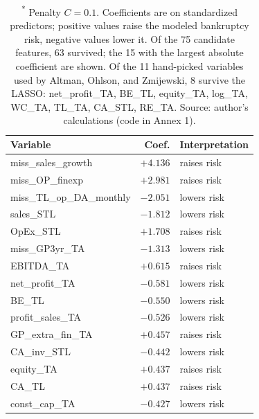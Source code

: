\documentclass[12pt,a4paper]{article}
\begin{document}
\begin{table}[ht]
\centering
\caption{Top variables selected by the LASSO logit, H1.\textsuperscript{*}}
\label{tab:lasso-survivors}
\small
\begin{tabular}{lrl}
\toprule
Variable & Coef. & Interpretation \\
\midrule
miss\_sales\_growth        & $+4.136$ & raises risk \\
miss\_OP\_finexp           & $+2.981$ & raises risk \\
miss\_TL\_op\_DA\_monthly  & $-2.051$ & lowers risk \\
sales\_STL                 & $-1.812$ & lowers risk \\
OpEx\_STL                  & $+1.708$ & raises risk \\
miss\_GP3yr\_TA            & $-1.313$ & lowers risk \\
EBITDA\_TA                 & $+0.615$ & raises risk \\
net\_profit\_TA            & $-0.581$ & lowers risk \\
BE\_TL                     & $-0.550$ & lowers risk \\
profit\_sales\_TA          & $-0.526$ & lowers risk \\
GP\_extra\_fin\_TA         & $+0.457$ & raises risk \\
CA\_inv\_STL               & $-0.442$ & lowers risk \\
equity\_TA                 & $+0.437$ & raises risk \\
CA\_TL                     & $+0.437$ & raises risk \\
const\_cap\_TA             & $-0.427$ & lowers risk \\
\bottomrule
\end{tabular}
\caption*{\footnotesize \textsuperscript{*} Penalty $C = 0.1$. Coefficients are on
standardized predictors; positive values raise the modeled bankruptcy risk,
negative values lower it. Of the 75 candidate features, 63 survived; the 15
with the largest absolute coefficient are shown. Of the 11 hand-picked
variables used by Altman, Ohlson, and Zmijewski, 8 survive the LASSO:
net\_profit\_TA, BE\_TL, equity\_TA, log\_TA, WC\_TA, TL\_TA, CA\_STL, RE\_TA.
Source: author's calculations (code in Annex 1).}
\end{table}
\end{document}
